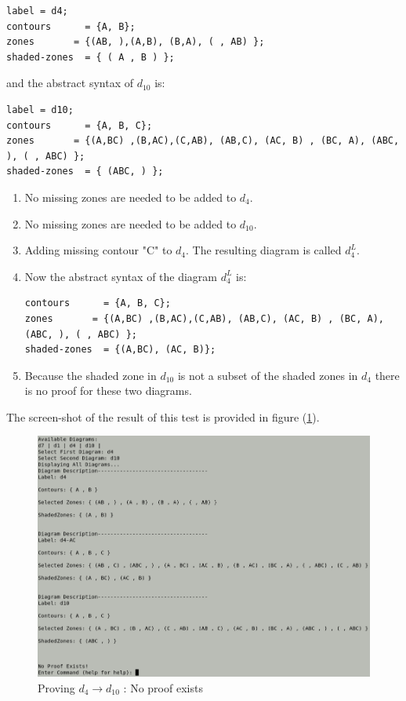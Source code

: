 \documentclass[10pt, a4paper, titlepage]{article}
\begin{document}
\small
\begin{lstlisting}
label = d4;
contours      = {A, B};
zones		= {(AB, ),(A,B), (B,A), ( , AB) };
shaded-zones  = { ( A , B ) };
\end{lstlisting}
\large

and the abstract syntax of $ d_{10} $ is:

\small
\begin{lstlisting}
label = d10;
contours      = {A, B, C};
zones		= {(A,BC) ,(B,AC),(C,AB), (AB,C), (AC, B) , (BC, A), (ABC, ), ( , ABC) };
shaded-zones  = { (ABC, ) };
\end{lstlisting}
\large

\begin{enumerate}
\item No missing zones are needed to be added to $ d_{4} $.
\item No missing zones are needed to be added to $ d_{10} $.
\item Adding missing contour "C" to $ d_{4} $. The resulting diagram is called $ d^L_{4} $.
\item Now the abstract syntax of the diagram $ d^L_{4} $ is:
\small
\begin{lstlisting}
contours      = {A, B, C};
zones		= {(A,BC) ,(B,AC),(C,AB), (AB,C), (AC, B) , (BC, A), (ABC, ), ( , ABC) };
shaded-zones  = {(A,BC), (AC, B)};
\end{lstlisting}
\large
\item Because the shaded zone in $ d_{10} $ is not a subset of the shaded zones in $ d_{4} $ there is no proof for these two diagrams.
\end{enumerate}  

The screen-shot of the result of this test is provided in figure (\ref{fig:test2}).

\begin{figure}[h]
\centering
\includegraphics[scale=0.5]{images/ss4.png}
\caption{Proving $  d_{4} \rightarrow d_{10} $ : No proof exists}
\label{fig:test2}
\end{figure}
\end{document}
